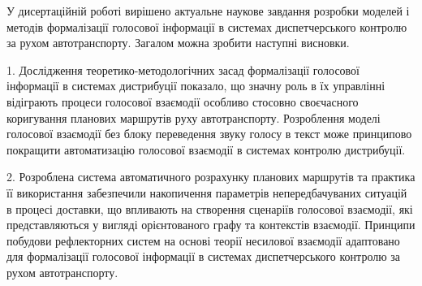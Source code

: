 У дисертаційній роботі вирішено актуальне наукове завдання розробки моделей і методів формалізації голосової інформації в системах диспетчерського контролю за рухом автотранспорту. Загалом можна зробити наступні висновки.

1. Дослідження теоретико-методологічних засад формалізації голосової інформації в системах дистрибуції показало, що значну роль в їх управлінні відіграють процеси голосової взаємодії особливо стосовно своєчасного коригування планових маршрутів руху автотранспорту. Розроблення моделі голосової взаємодії без блоку переведення звуку голосу в текст може принципово покращити автоматизацію голосової взаємодії в системах контролю дистрибуції.


2. Розроблена система автоматичного розрахунку планових маршрутів та практика її використання забезпечили накопичення параметрів непередбачуваних ситуацій в процесі доставки, що впливають на створення сценаріїв голосової взаємодії, які представляються у вигляді орієнтованого графу та контекстів взаємодії. 
Принципи побудови рефлекторних систем на основі теорії несилової взаємодії адаптовано для формалізації голосової інформації в системах диспетчерського контролю за рухом автотранспорту.


